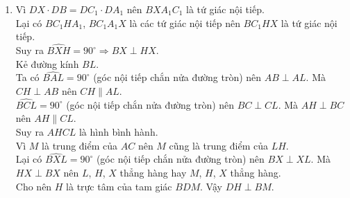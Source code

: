 \begin{ex}
{\begin{enumerate}
\begin{align*}
   \end{align*}
   Vậy $\triangle DCX \backsim \triangle DBA$ (g.g).\\
   Suy ra $\dfrac{DC}{DB} = \dfrac{DX}{DA}$ hay $DX \cdot DB = DC \cdot DA$.\\
   Xét hai tam giác $DCA_1$ và $DC_1A$ có
   \begin{align*}
    & \widehat{CDA_1} = \widehat{ADC_1} \\
    & \widehat{DA_1C} = 90^\circ + \widehat{DA_1A} \\
    & \widehat{DAC_1} = \widehat{ABC} + \widehat{ACB} = \widehat{ABC} + \widehat{BCC_1} + \widehat{C_1CA} = 90^\circ + \widehat{DA_1A} \\
    \text{Nên } & \widehat{DA_1C} = \widehat{DAC_1}
   \end{align*}
   Vậy $\triangle DCA_1 \backsim \triangle DC_1A$ (g.g).\\
   Suy ra $\dfrac{DA_1}{DA} = \dfrac{DC}{DC_1}$ hay $DC \cdot DA = DA_1 \cdot DC_1$.\\
   Vậy $DX \cdot DB = DC_1 \cdot DA_1$.
   
   \item Vì $DX \cdot DB = DC_1 \cdot DA_1$ nên $BXA_1C_1$ là tứ giác nội tiếp.\\
   Lại có $BC_1HA_1$, $BC_1A_1X$ là các tứ giác nội tiếp nên $BC_1HX$ là tứ giác nội tiếp.\\
   Suy ra $\widehat{BXH} = 90^\circ \Rightarrow BX \perp HX$.\\
   Kẻ đường kính $BL$.\\
   Ta có $\widehat{BAL} = 90^\circ$ (góc nội tiếp chắn nửa đường tròn) nên $AB \perp AL$. Mà $CH \perp AB$ nên $CH \parallel AL$.\\
   \hspace*{1cm}$\widehat{BCL} = 90^\circ$ (góc nội tiếp chắn nửa đường tròn) nên $BC \perp CL$. Mà $AH \perp BC$ nên $AH \parallel CL$.\\
   Suy ra $AHCL$ là hình bình hành.\\
   Vì $M$ là trung điểm của $AC$ nên $M$ cũng là trung điểm của $LH$.\\
   Lại có $\widehat{BXL} = 90^\circ$ (góc nội tiếp chắn nửa đường tròn) nên $BX \perp XL$. Mà $HX \perp BX$ nên $L$, $H$, $X$ thẳng hàng hay $M$, $H$, $X$ thẳng hàng.\\
   Cho nên $H$ là trực tâm của tam giác $BDM$. Vậy $DH \perp BM$.
  \end{enumerate}
  }
\end{ex}


